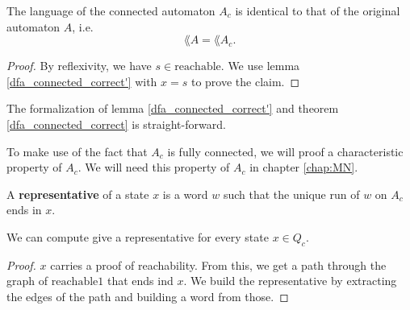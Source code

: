 \begin{theorem}
    \label{dfa_connected_correct}
    The language of the connected automaton $A_c$ is identical to that of the original automaton $A$, i.e.
    \begin{equation*}
        \lang{A} = \lang{A_c}.        
    \end{equation*}
\end{theorem}

\begin{proof}
    By reflexivity, we have $s \in \mathrm{reachable}$. 
    We use lemma \ref{dfa_connected_correct'} with $x = s$ to prove the claim.
\end{proof}


The formalization of lemma \ref{dfa_connected_correct'} and theorem \ref{dfa_connected_correct} is straight-forward.



To make use of the fact that $A_c$ is fully connected, we will proof a characteristic property of $A_c$. 
We will need this property of $A_c$ in chapter \ref{chap:MN}.


\begin{definition}
    A \textbf{representative} of a state $x$ is a word $w$ such that the unique run of $w$ on $A_c$ ends in $x$.
\end{definition}

\begin{lemma}
    \label{dfa_connected_repr}
    We can compute give a representative for every state $x \in Q_c$.
\end{lemma}

\begin{proof}
    $x$ carries a proof of reachability.
    From this, we get a path through the graph of $\mathrm{reachable1}$ that ends ind $x$.
    We build the representative by extracting the edges of the path and building a word from those.
\end{proof}



